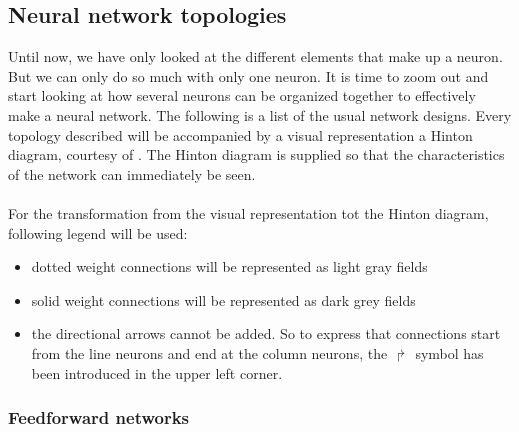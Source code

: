 \documentclass[pdftex,a4paper,12pt,twoside]{report}
\theoremstyle{plain} \newtheorem{theorem}{Theorem} \newtheorem{proposition}{Proposition} \newtheorem{lemma}{Lemma} \newtheorem*{corollary}{Corollary}
\theoremstyle{definition} \newtheorem{definition}{Definition} \newtheorem{conjecture}{Conjecture} \newtheorem*{example}{Example} \newtheorem{algorithm}{Algorithm}
\theoremstyle{remark} \newtheorem*{remark}{Remark} \newtheorem*{note}{Note} \newtheorem{case}{Case}
\begin{document}
\subsection{Neural network topologies}
Until now, we have only looked at the different elements that make up a neuron. But we can only do so much with only one neuron. It is time to zoom out and start looking at how several neurons can be organized together to effectively make a neural network. The following is a list of the usual network designs. Every topology described will be accompanied by a visual representation a Hinton diagram, courtesy of \citep{Kriesel2013}. The Hinton diagram is supplied so that the characteristics of the network can immediately be seen.\\\\For the transformation from the visual representation tot the Hinton diagram, following legend will be used:
\begin{itemize}
\item dotted weight connections will be represented as light gray fields
\item solid weight connections will be represented as dark grey fields
\item the directional arrows cannot be added. So to express that connections start from the line neurons and end at the column neurons, the $\Rsh$ symbol has been introduced in the upper left corner.
\end{itemize}
\subsubsection{Feedforward networks}
\end{document}
